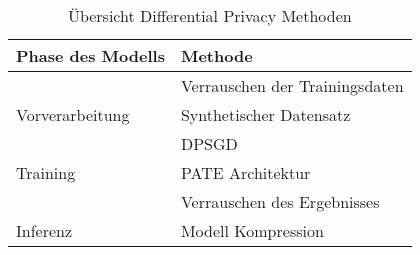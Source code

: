 \begin{table}[!htb]
\centering
\begin{tabular}{|l|l|}
\hline
\rowcolor[HTML]{CBCEFB} 
{\color[HTML]{000000} Phase des Modells} & {\color[HTML]{000000} Methode} \\ \hline
                                         & Verrauschen der Trainingsdaten \\ \cline{2-2} 
\multirow{-2}{*}{Vorverarbeitung}        & Synthetischer Datensatz        \\ \hline
                                         & DPSGD                          \\ \cline{2-2} 
\multirow{-2}{*}{Training}               & PATE Architektur               \\ \hline
                                         & Verrauschen des Ergebnisses    \\ \cline{2-2}
\multirow{-2}{*}{Inferenz}               & Modell Kompression           \\ \hline                                           
\end{tabular}
\caption{Übersicht Differential Privacy Methoden}
\label{tab:dp_methods}
\end{table}